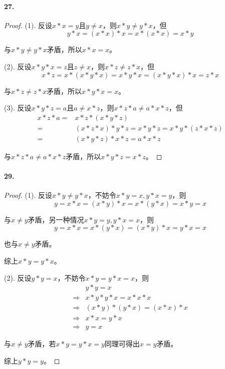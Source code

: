 \documentclass[12pt, a4paper, oneside]{ctexart}
\begin{document}
\paragraph{27.}\begin{proof}
    (1). 反设$x*x=y$且$y\neq x$，则$x*y\neq y*x$，但
    \begin{equation*}
        y*x=(x*x)*x=x*(x*x)=x*y
    \end{equation*}

    与$x*y\neq y*x$矛盾，所以$x*x=x$。

    (2). 反设$x*y*x=z$且$z\neq x$，则$x*z\neq z*x$，但
    \begin{equation*}
        x*z=x*(x*y*x)=x*y*x=(x*y*x)*x=z*x
    \end{equation*}

    与$x*z\neq z*x$矛盾，所以$x*y*x=x$。

    (3). 反设$x*y*z=a$且$a\neq x*z$，则$x*z*a\neq a*x*z$，但
    \begin{equation*}
        \begin{aligned}
            x*z*a=&x*z*(x*y*z)\\
            =&(x*z*x)*y*z=x*y*z=x*y*(z*x*z)\\
            =&(x*y*z)*x*z=a*x*z
        \end{aligned}
    \end{equation*}

    与$x*z*a\neq a*x*z$矛盾，所以$x*y*z=x*z$。
\end{proof}
\paragraph{29.}\begin{proof}
    (1). 反设$x*y\neq y*x$，不妨令$x*y=x,y*x=y$，则
    \begin{equation*}
        y=x*x=(x*y)*x=x*(y*x)=x*y=x
    \end{equation*}
    
    与$x\neq y$矛盾，另一种情况$x*y=y,y*x=x$，则
    \begin{equation*}
        y=x*x=x*(y*x)=(x*y)*x=y*x=x
    \end{equation*}

    也与$x\neq y$矛盾。

    综上$x*y=y*x$。

    (2). 反设$y*y=x$，不妨令$x*y=y*x=x$，则
    \begin{equation*}
        \begin{aligned}
            &y*y=x\\
            \Rightarrow&x*y*y*x=x*x*x\\
            \Rightarrow&(x*y)*(y*x)=(x*x)*x\\
            \Rightarrow&x*x=y*x\\
            \Rightarrow&y=x
        \end{aligned}
    \end{equation*}
    
    与$x\neq y$矛盾，若$x*y=y*x=y$同理可得出$x=y$矛盾。

    综上$y*y=y$。
\end{proof}
\end{document}
